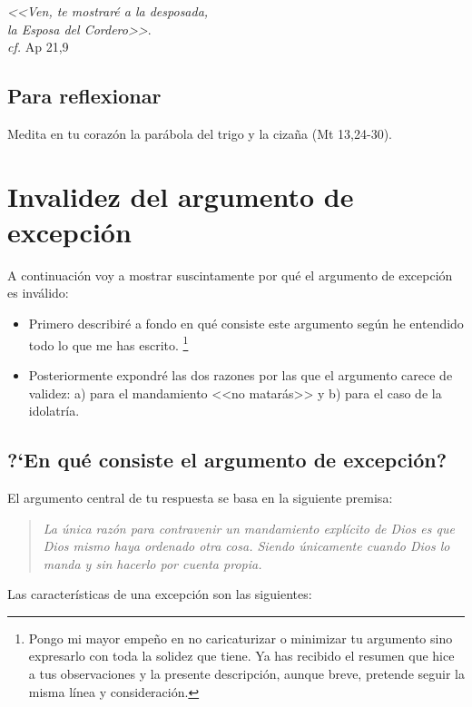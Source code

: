 \documentclass{article}
\begin{document}
\begin{flushright}
\emph{<<Ven, te mostrar\'e a la desposada,\\
la Esposa del Cordero>>}.\\
\emph{cf.} Ap 21,9
\end{flushright}

\subsection{Para reflexionar}

Medita en tu coraz\'on la par\'abola del trigo y la ciza\~na (Mt 13,24-30).

\section{Invalidez del argumento de excepci\'on}

A continuaci\'on voy a mostrar suscintamente por qu\'e el argumento de excepci\'on es inv\'alido:

\begin{itemize}
\item Primero describir\'e a fondo en qu\'e consiste este argumento seg\'un he entendido todo lo que me has escrito.%
    \footnote{Pongo mi mayor empe\~no en no caricaturizar o minimizar tu argumento sino expresarlo con toda la solidez que tiene. Ya has recibido el resumen que hice a tus observaciones y la presente descripci\'on, aunque breve, pretende seguir la misma l\'{i}nea y consideraci\'on.}
\item Posteriormente expondr\'e las dos razones por las que el argumento carece de validez: a) para el mandamiento <<no matar\'as>> y b) para el caso de la idolatr\'{i}a.
\end{itemize}

\subsection{?`En qu\'e consiste el argumento de excepci\'on?}

El argumento central de tu respuesta se basa en la siguiente premisa:

\begin{quote}
\emph{La \'unica raz\'on para contravenir un mandamiento expl\'{i}cito de Dios es que Dios mismo haya ordenado otra cosa. Siendo \'unicamente cuando Dios lo manda y sin hacerlo por cuenta propia.}
\end{quote}

\noindent
Las caracter\'{i}sticas de una excepci\'on son las siguientes:
\end{document}
